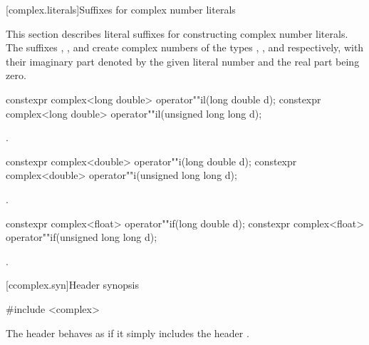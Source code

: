 [complex.literals]{Suffixes for complex number literals}

%
%
\pnum
This section describes literal suffixes for constructing complex number literals.
The suffixes , , and  create complex numbers of
the types , , and
 respectively, with their imaginary part denoted by the
given literal number and the real part being zero.

%
\begin{itemdecl}
constexpr complex<long double> operator""il(long double d);
constexpr complex<long double> operator""il(unsigned long long d);
\end{itemdecl}

\begin{itemdescr}
\pnum
\returns
{}.
\end{itemdescr}

%
\begin{itemdecl}
constexpr complex<double> operator""i(long double d);
constexpr complex<double> operator""i(unsigned long long d);
\end{itemdecl}

\begin{itemdescr}
\pnum
\returns
{}.
\end{itemdescr}

%
\begin{itemdecl}
constexpr complex<float> operator""if(long double d);
constexpr complex<float> operator""if(unsigned long long d);
\end{itemdecl}

\begin{itemdescr}
\pnum
\returns
{}.
\end{itemdescr}

[ccomplex.syn]{Header  synopsis}
%
%

\begin{codeblock}
#include <complex>
\end{codeblock}

\pnum
The header 
behaves as if it simply includes the header .

